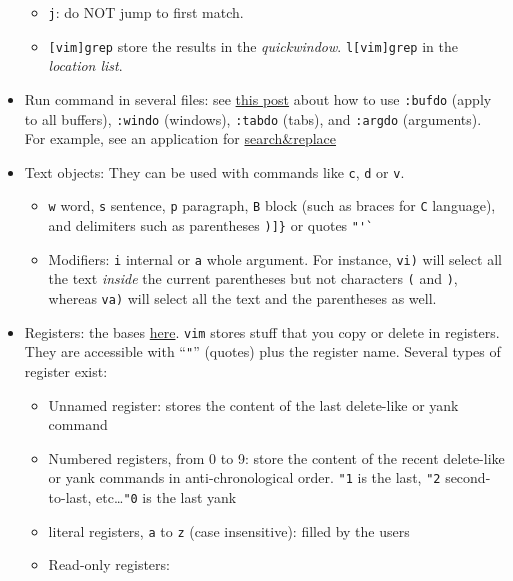 \documentclass[a4paper,12pt,%
              final%
              ]{article}
\newcommand{\vim}{\texttt{vim}}
\begin{document}
\begin{itemize}
\begin{itemize}
      \item \texttt{j}: do NOT jump to first match.
      \item \texttt{[vim]grep} store the results in the \emph{quickwindow}.
        \texttt{l[vim]grep} in the \emph{location list}.
    \end{itemize}
  \item Run command in several files: see
    \href{https://vim.fandom.com/wiki/Run_a_command_in_multiple_buffers}{this post}
    about how to use \verb|:bufdo| (apply to all buffers), \verb|:windo| (windows),
    \verb|:tabdo| (tabs), and \verb|:argdo| (arguments). For example, see an
    application for
    \href{https://vim.fandom.com/wiki/Search_and_replace_in_multiple_buffers}{search\&replace}
  \item Text objects: They can be used with commands like \texttt{c}, \texttt{d} or
    \texttt{v}.
    \begin{itemize}
      \item \texttt{w} word, \texttt{s} sentence, \texttt{p} paragraph, \texttt{B}
        block (such as braces for \texttt{C} language), and delimiters such as
        parentheses \verb|)]}| or quotes \verb|"'`|
      \item Modifiers: \texttt{i} internal or \texttt{a} whole argument. For
        instance, \texttt{vi)} will select all the text \emph{inside} the current
        parentheses but not characters \texttt{(} and \texttt{)}, whereas
        \texttt{va)} will select all the text and the parentheses as well.
    \end{itemize}
  \item Registers: the bases \href{https://www.brianstorti.com/vim-registers/}{here}.
    \vim{} stores stuff that you copy or delete in registers. They are accessible
    with ``\texttt{"}'' (quotes) plus the register name. Several types of register
    exist:
    \begin{itemize}
      \item Unnamed register: stores the content of the last delete-like or yank
        command
      \item Numbered registers, from 0 to 9: store the content of the recent
        delete-like or yank commands in anti-chronological order. \texttt{"1} is the
        last, \texttt{"2} second-to-last, etc\ldots \texttt{"0} is the last yank
      \item literal registers, \texttt{a} to \texttt{z} (case insensitive): filled by
        the users
      \item Read-only registers:

\end{itemize}
\end{itemize}
\end{document}
